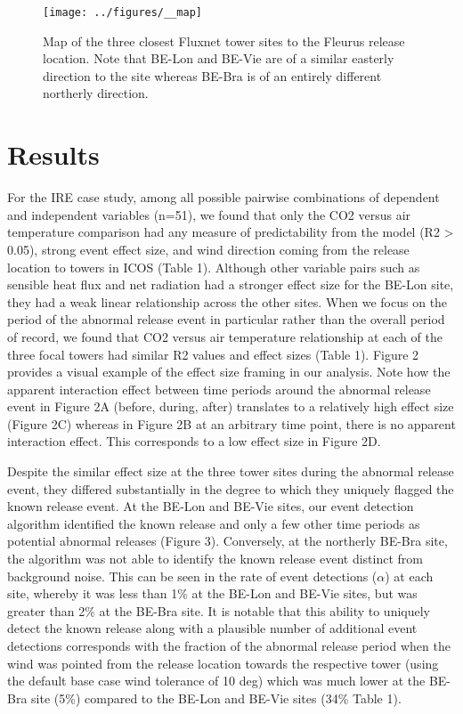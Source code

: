 \documentclass{article}
\begin{document}
\begin{figure}
	\centering
	\texttt{[image: ../figures/\_\_map]}
	\caption{Map of the three closest Fluxnet tower sites to the Fleurus release location. Note that BE-Lon and BE-Vie are of a similar easterly direction to the site whereas BE-Bra is of an entirely different northerly direction.}
	\label{fig:study_site}
\end{figure}

\section{Results}

For the IRE case study, among all possible pairwise combinations of dependent and independent variables (n=51), we found that only the CO2 versus air temperature comparison had any measure of predictability from the model (R2 > 0.05), strong event effect size, and wind direction coming from the release location to towers in ICOS (Table 1). Although other variable pairs such as sensible heat flux and net radiation had a stronger effect size for the BE-Lon site, they had a weak linear relationship across the other sites. When we focus on the period of the abnormal release event in particular rather than the overall period of record, we found that CO2 versus air temperature relationship at each of the three focal towers had similar R2 values and effect sizes (Table 1). Figure 2 provides a visual example of the effect size framing in our analysis. Note how the apparent interaction effect between time periods around the abnormal release event in Figure 2A (before, during, after) translates to a relatively high effect size (Figure 2C) whereas in Figure 2B at an arbitrary time point, there is no apparent interaction effect. This corresponds to a low effect size in Figure 2D. 

Despite the similar effect size at the three tower sites during the abnormal release event, they differed substantially in the degree to which they uniquely flagged the known release event. At the BE-Lon and BE-Vie sites, our event detection algorithm identified the known release and only a few other time periods as potential abnormal releases (Figure 3). Conversely, at the northerly BE-Bra site, the algorithm was not able to identify the known release event distinct from background noise. This can be seen in the rate of event detections ($\alpha$) at each site, whereby it was less than 1\% at the BE-Lon and BE-Vie sites, but was greater than 2\% at the BE-Bra site. It is notable that this ability to uniquely detect the known release along with a plausible number of additional event detections corresponds with the fraction of the abnormal release period when the wind was pointed from the release location towards the respective tower (using the default base case wind tolerance of 10 deg) which was much lower at the BE-Bra site (5\%) compared to the BE-Lon and BE-Vie sites (34\% Table 1). 
\end{document}
